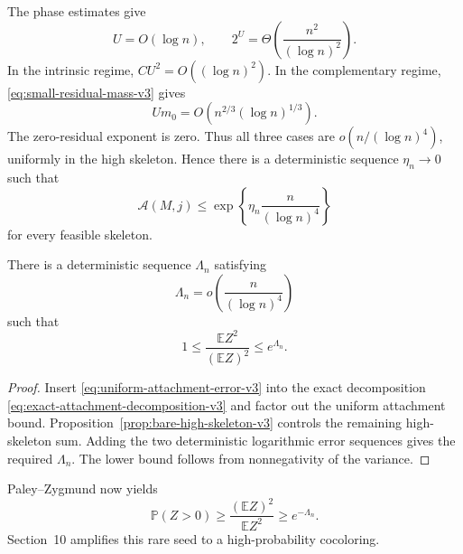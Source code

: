 The phase estimates give
\[
  U=O(\log n),
  \qquad
  2^U=\Theta\!\left(\frac{n^2}{(\log n)^2}\right).
\]
In the intrinsic regime, $CU^2=O((\log n)^2)$. In the complementary regime,
\eqref{eq:small-residual-mass-v3} gives
\[
  Um_0
  =
  O\!\left(n^{2/3}(\log n)^{1/3}\right).
\]
The zero-residual exponent is zero. Thus all three cases are
$o(n/(\log n)^4)$, uniformly in the high skeleton. Hence there is a
deterministic sequence $\eta_n\to0$ such that
\begin{equation}
  \mathcal A(M,j)
  \le
  \exp\!\left\{
    \eta_n\frac{n}{(\log n)^4}
  \right\}
  \label{eq:uniform-attachment-error-v3}
\end{equation}
for every feasible skeleton.

\begin{proposition}
\label{prop:normalized-second-moment-v3}
There is a deterministic sequence $\Lambda_n$ satisfying
\[
  \Lambda_n=o\!\left(\frac{n}{(\log n)^4}\right)
\]
such that
\begin{equation}
  1
  \le
  \frac{\mathbb E Z^2}{(\mathbb E Z)^2}
  \le
  e^{\Lambda_n}.
  \label{eq:normalized-second-moment-v3}
\end{equation}
\end{proposition}

\begin{proof}
Insert \eqref{eq:uniform-attachment-error-v3} into the exact decomposition
\eqref{eq:exact-attachment-decomposition-v3} and factor out the uniform
attachment bound. Proposition~\ref{prop:bare-high-skeleton-v3} controls the
remaining high-skeleton sum. Adding the two deterministic logarithmic error
sequences gives the required $\Lambda_n$. The lower bound follows from
nonnegativity of the variance.
\end{proof}

Paley--Zygmund now yields
\[
  \mathbb P(Z>0)
  \ge
  \frac{(\mathbb E Z)^2}{\mathbb E Z^2}
  \ge e^{-\Lambda_n}.
\]
Section~10 amplifies this rare seed to a high-probability cocoloring.

